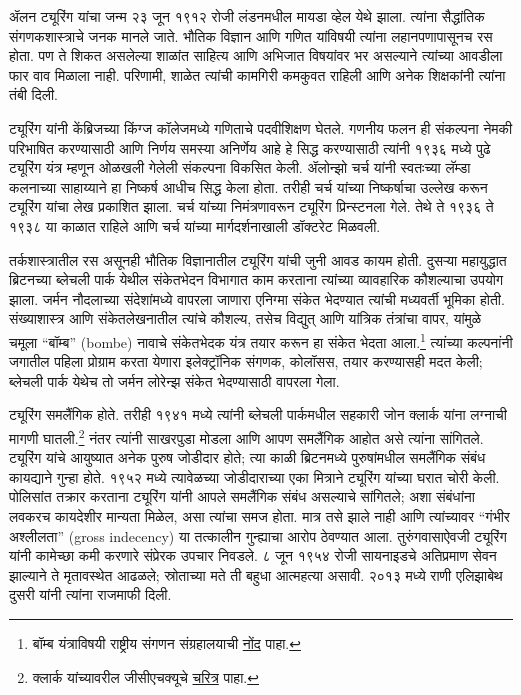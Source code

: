 \documentclass[../../../include/open-logic-section]{subfiles}
\begin{document}


ॲलन ट्यूरिंग यांचा जन्म २३ जून १९१२ रोजी लंडनमधील मायडा व्हेल येथे झाला. त्यांना सैद्धांतिक संगणकशास्त्राचे जनक मानले जाते. भौतिक विज्ञान आणि गणित यांविषयी त्यांना लहानपणापासूनच रस होता. पण ते शिकत असलेल्या शाळांत साहित्य आणि अभिजात विषयांवर भर असल्याने त्यांच्या आवडीला फार वाव मिळाला नाही. परिणामी, शाळेत त्यांची कामगिरी कमकुवत राहिली आणि अनेक शिक्षकांनी त्यांना तंबी दिली.


ट्यूरिंग यांनी केंब्रिजच्या किंग्ज कॉलेजमध्ये गणिताचे पदवीशिक्षण घेतले. गणनीय फलन ही संकल्पना नेमकी परिभाषित करण्यासाठी आणि निर्णय समस्या अनिर्णेय आहे हे सिद्ध करण्यासाठी त्यांनी १९३६ मध्ये पुढे ट्यूरिंग यंत्र म्हणून ओळखली गेलेली संकल्पना विकसित केली. ॲलोन्झो चर्च यांनी स्वतःच्या लॅम्डा कलनाच्या साहाय्याने हा निष्कर्ष आधीच सिद्ध केला होता. तरीही चर्च यांच्या निष्कर्षाचा उल्लेख करून ट्यूरिंग यांचा लेख प्रकाशित झाला. चर्च यांच्या निमंत्रणावरून ट्यूरिंग प्रिन्स्टनला गेले. तेथे ते १९३६ ते १९३८ या काळात राहिले आणि चर्च यांच्या मार्गदर्शनाखाली डॉक्टरेट मिळवली.

तर्कशास्त्रातील रस असूनही भौतिक विज्ञानातील ट्यूरिंग यांची जुनी आवड कायम होती. दुसऱ्या महायुद्धात ब्रिटनच्या ब्लेचली पार्क येथील संकेतभेदन विभागात काम करताना त्यांच्या व्यावहारिक कौशल्याचा उपयोग झाला. जर्मन नौदलाच्या संदेशांमध्ये वापरला जाणारा एनिग्मा संकेत भेदण्यात त्यांची मध्यवर्ती भूमिका होती. संख्याशास्त्र आणि संकेतलेखनातील त्यांचे कौशल्य, तसेच विद्युत् आणि यांत्रिक तंत्रांचा वापर, यांमुळे चमूला “बॉम्ब” (bombe) नावाचे संकेतभेदक यंत्र तयार करून हा संकेत भेदता आला.\footnote{बॉम्ब यंत्राविषयी राष्ट्रीय संगणन संग्रहालयाची \href{https://www.tnmoc.org/bombe}{नोंद} पाहा.} त्यांच्या कल्पनांनी जगातील पहिला प्रोग्राम करता येणारा इलेक्ट्रॉनिक संगणक, कोलॉसस, तयार करण्यासही मदत केली; ब्लेचली पार्क येथेच तो जर्मन लोरेन्झ संकेत भेदण्यासाठी वापरला गेला.

ट्यूरिंग समलैंगिक होते. तरीही १९४१ मध्ये त्यांनी ब्लेचली पार्कमधील सहकारी जोन क्लार्क यांना लग्नाची मागणी घातली.\footnote{क्लार्क यांच्यावरील जीसीएचक्यूचे \href{https://www.gchq.gov.uk/information/joan-clarke}{चरित्र} पाहा.} नंतर त्यांनी साखरपुडा मोडला आणि आपण समलैंगिक आहोत असे त्यांना सांगितले. ट्यूरिंग यांचे आयुष्यात अनेक पुरुष जोडीदार होते; त्या काळी ब्रिटनमध्ये पुरुषांमधील समलैंगिक संबंध कायद्याने गुन्हा होते. १९५२ मध्ये त्यावेळच्या जोडीदाराच्या एका मित्राने ट्यूरिंग यांच्या घरात चोरी केली. पोलिसांत तक्रार करताना ट्यूरिंग यांनी आपले समलैंगिक संबंध असल्याचे सांगितले; अशा संबंधांना लवकरच कायदेशीर मान्यता मिळेल, असा त्यांचा समज होता. मात्र तसे झाले नाही आणि त्यांच्यावर “गंभीर अश्लीलता” (gross indecency) या तत्कालीन गुन्ह्याचा आरोप ठेवण्यात आला. तुरुंगवासाऐवजी ट्यूरिंग यांनी कामेच्छा कमी करणारे संप्रेरक उपचार निवडले. ८ जून १९५४ रोजी सायनाइडचे अतिप्रमाण सेवन झाल्याने ते मृतावस्थेत आढळले; स्रोताच्या मते ती बहुधा आत्महत्या असावी. २०१३ मध्ये राणी एलिझाबेथ दुसरी यांनी त्यांना राजमाफी दिली.
\end{document}
